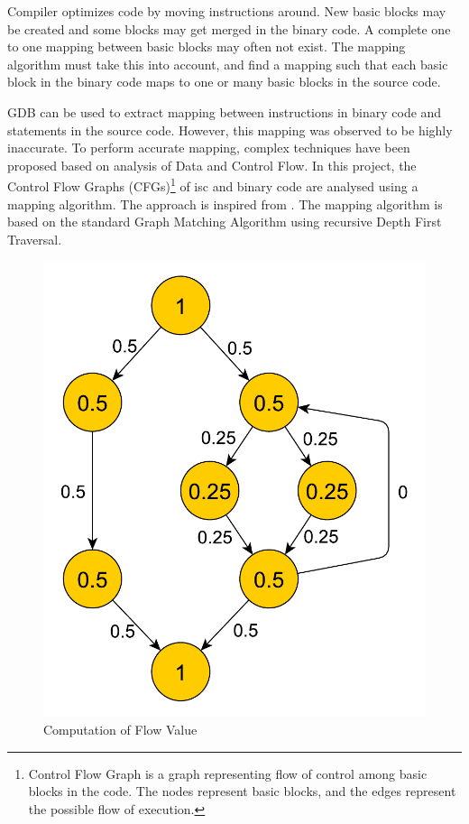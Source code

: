Compiler optimizes code by moving instructions around. New basic blocks may be created and some blocks may get merged in the binary code. A complete one to one mapping between basic blocks may often not exist. The mapping algorithm must take this into account, and find a mapping such that each basic block in the binary code maps to one or many basic blocks in the source code.

GDB can be used to extract mapping between instructions in binary code and statements in the source code. However, this mapping was observed to be highly inaccurate. To perform accurate mapping, complex techniques have been proposed based on analysis of Data and Control Flow. In this project, the Control Flow Graphs (CFGs)\footnote{Control Flow Graph is a graph representing flow of control among basic blocks in the code. The nodes represent basic blocks, and the edges represent the possible flow of execution.} of \gls{isc} and binary code are analysed using a mapping algorithm. The approach is inspired from \cite{RBA2013}. The mapping algorithm is based on the standard Graph Matching Algorithm using recursive Depth First Traversal.


\begin{figure}[h]
\centering
\includegraphics[width=.35\textwidth]{figures/flowValueComputation.pdf}
\caption{Computation of Flow Value}
\label{fig:flowValueComp}
\end{figure}

